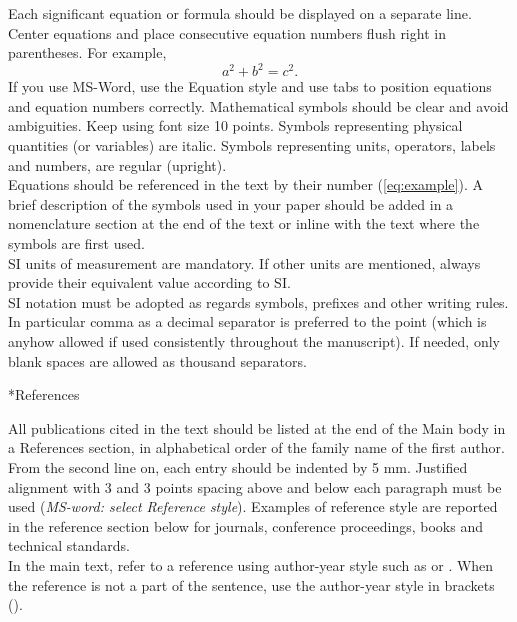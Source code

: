 \documentclass[twocolumn, a4paper,10pt]{article}
\makeatletter
\renewcommand\subsection{\@startsection{subsection}{1}{\z@}{\z@}{\z@}{\normalfont\normalsize\bfseries}}
\renewcommand\subsection{\@startsection{subsection}{1}{\z@}{\z@}{0.1pt}{\normalfont\normalsize\bfseries}}
\makeatother
\begin{document}
Each significant equation or formula should be displayed on a separate line. Center equations and place consecutive equation numbers flush right in parentheses. For example,
\begin{equation}\label{eq:example}
  a^2+b^2=c^2.
\end{equation}
If you use MS-Word, use the Equation style and use tabs to position equations and equation numbers correctly.
Mathematical symbols should be clear and avoid ambiguities. Keep using font size 10 points. Symbols representing physical quantities (or variables) are italic. Symbols representing units, operators, labels and numbers, are regular (upright).\\
Equations should be referenced in the text by their number (\ref{eq:example}). A brief description of the symbols used in your paper should be added in a nomenclature section at the end of the text or inline with the text where the symbols are first used.\\
SI units of measurement are mandatory. If other units are mentioned, always provide their equivalent value according to SI.\\
SI notation must be adopted as regards symbols, prefixes and other writing rules. In particular comma as a decimal separator is preferred to the point (which is anyhow allowed if used consistently throughout the manuscript). If needed, only blank spaces are allowed as thousand separators.

\subsection*{References}

All publications cited in the text should be listed at the end of the Main body in a References section, in alphabetical order of the family name of the first author. From the second line on, each entry should be indented by 5 mm. Justified alignment with 3 and 3 points spacing above and below each paragraph must be used (\textit{MS-word: select \textit{Reference style}}). Examples of reference style are reported in the reference section below for journals, conference proceedings, books and technical standards.\\
In the main text, refer to a reference using author-year style such as \citet{Clarke2015:1} or \citet{ChuMajumdar2012}. When the reference is not a part of the sentence, use the author-year style in brackets (\cite{Clarke2015:1, ChuMajumdar2012,Monarim2014, BSDO2011, Mahdavi2011,iso52017}).
\end{document}
